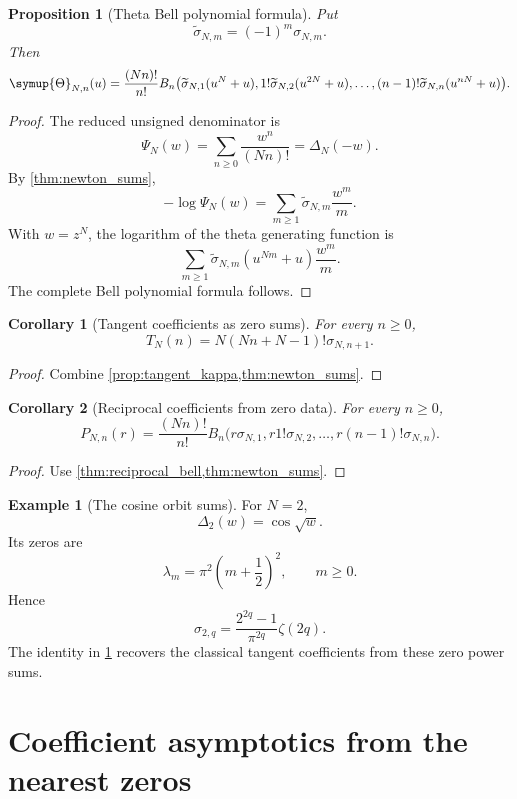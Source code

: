 \documentclass[11pt,letterpaper]{article}
\newtheorem{proposition}[proposition]{Proposition}
\newtheorem{corollary}[corollary]{Corollary}
\theoremstyle{definition}
\newtheorem{example}[example]{Example}
\theoremstyle{remark}
\newcommand{\Thetafun}{\symup{\Theta}}
\begin{document}
\begin{proposition}[Theta Bell polynomial formula]\label{prop:theta_bell}
Put
\[
\widetilde{\sigma}_{N,m}=(-1)^m\sigma_{N,m}.
\]
Then
\[
\Thetafun_{N,n}(u)
=
\frac{(Nn)!}{n!}
B_n\bigl(
 \widetilde{\sigma}_{N,1}(u^N+u),
 1!\widetilde{\sigma}_{N,2}(u^{2N}+u),
 \ldots,
 (n-1)!\widetilde{\sigma}_{N,n}(u^{nN}+u)
\bigr).
\]
\end{proposition}

\begin{proof}
The reduced unsigned denominator is
\[
\Psi_N(w)=\sum_{n\geq0}\frac{w^n}{(Nn)!}=\Delta_N(-w).
\]
By \cref{thm:newton_sums},
\[
-\log\Psi_N(w)
=
\sum_{m\geq1}\widetilde{\sigma}_{N,m}\frac{w^m}{m}.
\]
With $w=z^N$, the logarithm of the theta generating function is
\[
\sum_{m\geq1}
\widetilde{\sigma}_{N,m}(u^{Nm}+u)\frac{w^m}{m}.
\]
The complete Bell polynomial formula follows.
\end{proof}

\begin{corollary}[Tangent coefficients as zero sums]\label{cor:tangent_zero_sums}
For every $n\geq0$,
\[
T_N(n)
=
N(Nn+N-1)!\sigma_{N,n+1}.
\]
\end{corollary}

\begin{proof}
Combine \cref{prop:tangent_kappa,thm:newton_sums}.
\end{proof}

\begin{corollary}[Reciprocal coefficients from zero data]\label{cor:reciprocal_zero_data}
For every $n\geq0$,
\[
P_{N,n}(r)
=
\frac{(Nn)!}{n!}
B_n\bigl(
 r\sigma_{N,1},
 r1!\sigma_{N,2},
 \ldots,
 r(n-1)!\sigma_{N,n}
\bigr).
\]
\end{corollary}

\begin{proof}
Use \cref{thm:reciprocal_bell,thm:newton_sums}.
\end{proof}

\begin{example}[The cosine orbit sums]\label{ex:cosine_orbit_sums}
For $N=2$,
\[
\Delta_2(w)=\cos\sqrt w.
\]
Its zeros are
\[
\lambda_m=\pi^2\left(m+\frac12\right)^2,
\qquad m\geq0.
\]
Hence
\[
\sigma_{2,q}
=
\frac{2^{2q}-1}{\pi^{2q}}\zeta(2q).
\]
The identity in \cref{cor:tangent_zero_sums} recovers the classical tangent coefficients from these zero power sums.
\end{example}

\section{Coefficient asymptotics from the nearest zeros}\label{sec:coefficient_asymptotics}
\end{document}
